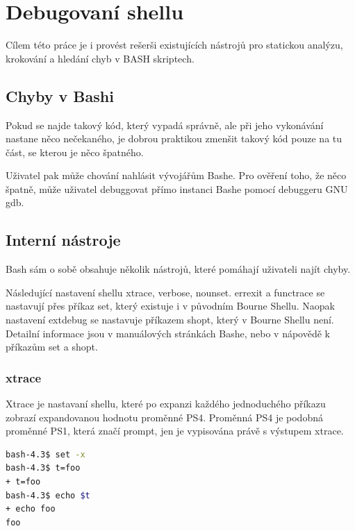 \documentclass[thesis=M,czech]{FITthesis}[2012/06/26]
\begin{document}
\section{Debugovaní shellu} %

Cílem této práce je i provést rešerši existujících nástrojů pro statickou analýzu, krokování a hledání chyb v BASH skriptech.


%
\subsection{Chyby v Bashi}

Pokud se najde takový kód, který vypadá správně, ale při jeho vykonávání nastane něco nečekaného, je dobrou praktikou zmenšit takový  kód pouze na tu část, se kterou je něco špatného.

Uživatel pak může chování nahlásit vývojářům Bashe. Pro ověření toho, že něco špatně, může uživatel debuggovat přímo instanci Bashe pomocí debuggeru GNU gdb.



%
\subsection{Interní nástroje}

Bash sám o sobě obsahuje několik nástrojů, které pomáhají uživateli najít chyby. 

Následující nastavení shellu xtrace, verbose, nounset. errexit a functrace se nastavují přes příkaz set, který existuje i v původním Bourne Shellu. Naopak nastavení extdebug se nastavuje příkazem shopt, který v Bourne Shellu není. Detailní informace jsou v manuálových stránkách Bashe, nebo v nápovědě k příkazům set a shopt.

\subsubsection{xtrace}

Xtrace je nastavaní shellu, které po expanzi každého jednoduchého příkazu zobrazí expandovanou hodnotu proměnné PS4. Proměnná PS4 je podobná proměnné PS1, která značí prompt, jen je vypisována právě s výstupem xtrace.

\begin{lstlisting}[language=bash, caption={Výstup z knihovny Bashlex}, label={lst:bashlex}]
bash-4.3$ set -x
bash-4.3$ t=foo
+ t=foo
bash-4.3$ echo $t
+ echo foo
foo
\end{lstlisting}
\end{document}

